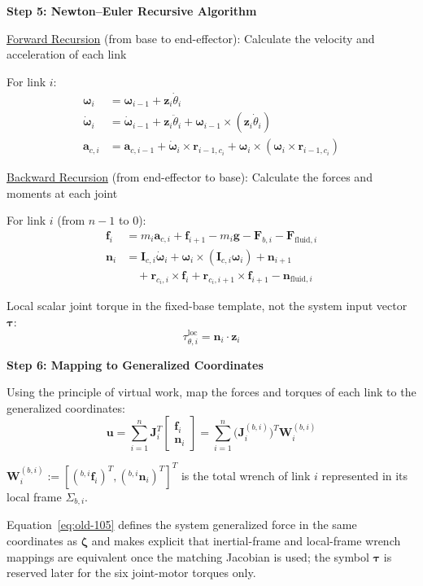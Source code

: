 \documentclass[12pt,a4paper]{report}
\newcommand{\newsymbols}[1]{\par\noindent{}#1\par\vspace{0.35em}}
\newcommand{\formulaannotation}[1]{\par\noindent{}#1\par\vspace{0.35em}}
\newcommand{\Frame}[1]{\Sigma_{#1}}
\begin{document}
\textbf{Step 5: Newton--Euler Recursive Algorithm}

\underline{Forward Recursion} (from base to end-effector): Calculate the velocity and acceleration of each link

For link $i$:
\begin{align}
\boldsymbol{\omega}_i &= \boldsymbol{\omega}_{i-1} + \mathbf{z}_i \dot{\theta}_i \\
\dot{\boldsymbol{\omega}}_i &= \dot{\boldsymbol{\omega}}_{i-1} + \mathbf{z}_i \ddot{\theta}_i + \boldsymbol{\omega}_{i-1} \times (\mathbf{z}_i \dot{\theta}_i) \\
\mathbf{a}_{c,i} &= \mathbf{a}_{c,i-1} + \dot{\boldsymbol{\omega}}_i \times \mathbf{r}_{i-1,c_i} + \boldsymbol{\omega}_i \times (\boldsymbol{\omega}_i \times \mathbf{r}_{i-1,c_i})
\end{align}

\underline{Backward Recursion} (from end-effector to base): Calculate the forces and moments at each joint

For link $i$ (from $n-1$ to $0$):
\begin{align}
\mathbf{f}_i &= m_i \mathbf{a}_{c,i} + \mathbf{f}_{i+1} - m_i \mathbf{g} - \mathbf{F}_{b,i} - \mathbf{F}_{\text{fluid},i} \\
\mathbf{n}_i &= \mathbf{I}_{c,i}\dot{\boldsymbol{\omega}}_i + \boldsymbol{\omega}_i \times (\mathbf{I}_{c,i}\boldsymbol{\omega}_i) + \mathbf{n}_{i+1} \nonumber \\
&\quad + \mathbf{r}_{c_i,i} \times \mathbf{f}_i + \mathbf{r}_{c_i,i+1} \times \mathbf{f}_{i+1} - \mathbf{n}_{\text{fluid},i}
\end{align}

Local scalar joint torque in the fixed-base template, not the system input vector $\boldsymbol{\tau}$:
\begin{equation}
\tau_{\theta,i}^{\mathrm{loc}} = \mathbf{n}_i \cdot \mathbf{z}_i
\end{equation}

\textbf{Step 6: Mapping to Generalized Coordinates}

Using the principle of virtual work, map the forces and torques of each link to the generalized coordinates:
\begin{equation}
\mathbf{u}
=
\sum_{i=1}^{n} \mathbf{J}_i^T \begin{bmatrix} \mathbf{f}_i \\ \mathbf{n}_i \end{bmatrix}
=
\sum_{i=1}^{n} \bigl(\mathbf{J}_i^{(b,i)}\bigr)^T \mathbf{W}_i^{(b,i)}
\label{eq:old-105}
\end{equation}
\newsymbols{$\mathbf{W}_i^{(b,i)} := [({}^{b,i}\mathbf{f}_i)^T,({}^{b,i}\mathbf{n}_i)^T]^T$ is the total wrench of link $i$ represented in its local frame $\Frame{b,i}$.}
\formulaannotation{Equation~\eqref{eq:old-105} defines the system generalized force in the same coordinates as $\boldsymbol{\zeta}$ and makes explicit that inertial-frame and local-frame wrench mappings are equivalent once the matching Jacobian is used; the symbol $\boldsymbol{\tau}$ is reserved later for the six joint-motor torques only.}
\end{document}
